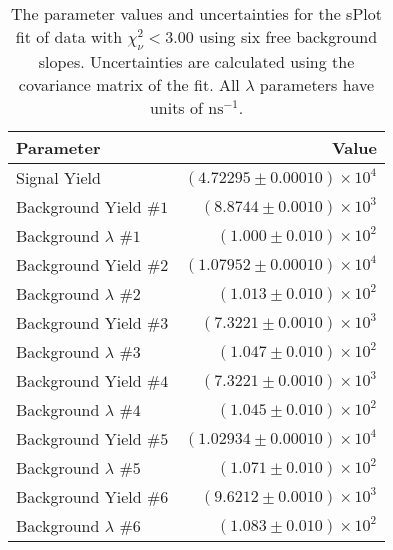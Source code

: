 
\begin{table}[ht]
    \begin{center}
        \begin{tabular}{lr}\toprule
            Parameter & Value \\\midrule
            Signal Yield & $(4.72295 \pm 0.00010) \times 10^{4}$ \\
            Background Yield $\#1$ & $(8.8744 \pm 0.0010) \times 10^{3}$ \\
            Background $\lambda$ $\#1$ & $(1.000 \pm 0.010) \times 10^{2}$ \\
            Background Yield $\#2$ & $(1.07952 \pm 0.00010) \times 10^{4}$ \\
            Background $\lambda$ $\#2$ & $(1.013 \pm 0.010) \times 10^{2}$ \\
            Background Yield $\#3$ & $(7.3221 \pm 0.0010) \times 10^{3}$ \\
            Background $\lambda$ $\#3$ & $(1.047 \pm 0.010) \times 10^{2}$ \\
            Background Yield $\#4$ & $(7.3221 \pm 0.0010) \times 10^{3}$ \\
            Background $\lambda$ $\#4$ & $(1.045 \pm 0.010) \times 10^{2}$ \\
            Background Yield $\#5$ & $(1.02934 \pm 0.00010) \times 10^{4}$ \\
            Background $\lambda$ $\#5$ & $(1.071 \pm 0.010) \times 10^{2}$ \\
            Background Yield $\#6$ & $(9.6212 \pm 0.0010) \times 10^{3}$ \\
            Background $\lambda$ $\#6$ & $(1.083 \pm 0.010) \times 10^{2}$ \\\bottomrule
        \end{tabular}
        \caption{The parameter values and uncertainties for the sPlot fit of data with $\chi^2_\nu < 3.00$ using six free background slopes. Uncertainties are calculated using the covariance matrix of the fit. All $\lambda$ parameters have units of $\si{\nano\second}^{-1}$.}\label{tab:splot-fit-results-chisqdof-3.00-free-6}
    \end{center}
\end{table}
